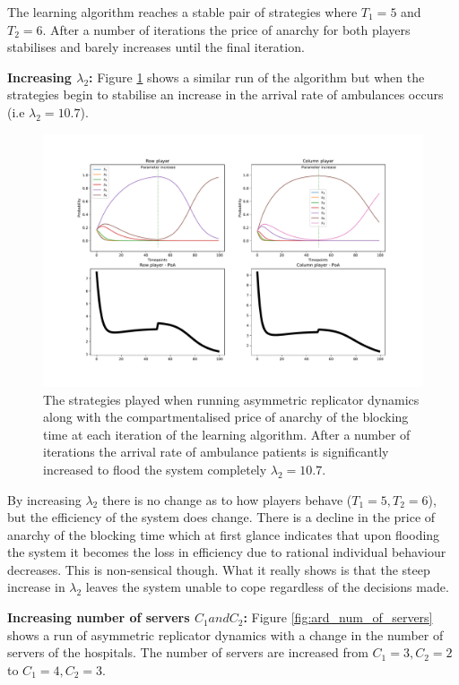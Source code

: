 The learning algorithm reaches a stable pair of 
strategies where \(T_1 = 5\) and \(T_2 = 6\). After a number of iterations the
price of anarchy for both players stabilises and barely increases until the 
final iteration. 

\textbf{Increasing \(\lambda_2\):}
Figure \ref{fig:ard_lambda_2} shows a similar run of the
algorithm but when the strategies begin to stabilise an increase in the
arrival rate of ambulances occurs (i.e \( \lambda_2 = 10.7 \)).


\begin{figure}[H]
    \includegraphics[width=\textwidth]{imgs/asymmetric_rd_and_PoA/asymmetric_flooding.pdf}
    \caption{The strategies played when running asymmetric replicator dynamics
    along with the compartmentalised price of anarchy of the blocking time at
    each iteration of the learning algorithm. After a number of iterations the 
    arrival rate of ambulance patients is significantly increased to flood the
    system completely \( \lambda_2 = 10.7 \).}
    \label{fig:ard_lambda_2}
\end{figure}


By increasing \(\lambda_2\) there is no change as to how players behave
(\(T_1 = 5, T_2 = 6\)), but the efficiency of the system does change. 
There is a decline in the price of anarchy of the blocking time which at first 
glance indicates that upon flooding the system it becomes the loss in efficiency
due to rational individual behaviour decreases. 
This is non-sensical though.
What it really shows is that the steep increase in \( \lambda_2 \) leaves 
the system unable to cope regardless of the decisions made.

\textbf{Increasing number of servers \( C_1 and C_2 \):}
Figure \ref{fig:ard_num_of_servers} shows a run of asymmetric replicator 
dynamics with a change in the number of servers of the hospitals.
The number of servers are increased from \(C_1 = 3, C_2 = 2\) to 
\(C_1 = 4, C_2 = 3\).



